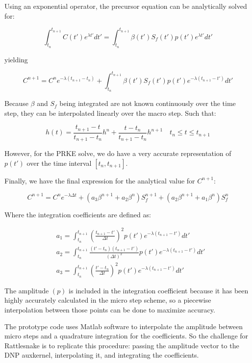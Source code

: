 \documentclass[10pt]{scrartcl}
\newcommand{\be}{\begin{equation}}
\newcommand{\ee}{\end{equation}}
\begin{document}
Using an exponential operator, the precursor equation can be analytically solved for:

\be
\int_{t_n}^{t_{n+1}} C(t')e^{\lambda t'} dt' = \int_{t_n}^{t_{n+1}} \beta(t') S_f(t') p(t')e^{\lambda t'}dt'
\ee

yielding

\be
C^{n+1} =  C^n e^{-\lambda (t_{n+1} - t_n) }  + \int_{t_n}^{t_{n+1}} \beta(t') S_f(t') p(t')e^{-\lambda (t_{n+1}-t')}dt'
\ee

Because $\beta$ and $S_f$ being integrated are not known continuously over the time step, they can be interpolated linearly over the macro step.  Such that:

\be
h(t) = \frac{t_{n+1}-t}{t_{n+1}-t_n}h^n  + \frac{t-t_n}{t_{n+1}-t_n}h^{n+1}  \quad t_n \le t \le t_{n+1}
\ee

However, for the PRKE solve, we do have a very accurate representation of $p(t')$ over the time interval $[t_n,t_{n+1}]$.

Finally, we have the final expression for the analytical value for $C^{n+1}$:

\be
C^{n+1} = C^n e^{-\lambda \Delta t} 
+ \left(a_3\beta^{n+1}+a_2\beta^n\right)S_f^{n+1}
+ \left(a_2\beta^{n+1}+a_1\beta^n\right)S_f^n 
\ee

Where the integration coefficients are defined as:

\begin{align}
&a_1 = \int_{t_n}^{t_{n+1}}\left(\frac{t_{n+1}-t'}{\Delta t}\right)^2p(t')e^{-\lambda(t_{n+1}-t')}dt' \\
&a_2= \int_{t_n}^{t_{n+1}}\frac{(t'-t_n)(t_{n+1}-t')}{(\Delta t)^2}p(t')e^{-\lambda(t_{n+1}-t')}dt' \\
&a_3 = \int_{t_n}^{t_{n+1}}\left(\frac{t'-t_n}{\Delta t}\right)^2p(t')e^{-\lambda(t_{n+1}-t')}dt'
\end{align}

The amplitude $(p)$ is included in the integration coefficient because it has been highly accurately calculated in the micro step scheme, so a piecewise interpolation between those points can be done to maximize accuracy.  

The prototype code uses Matlab software to interpolate the amplitude between micro steps and a quadrature integration for the coefficients.  So the challenge for Rattlesnake is to replicate this procedure: passing the amplitude vector to the DNP auxkernel, interpolating it, and integrating the coefficients. 
\end{document}
